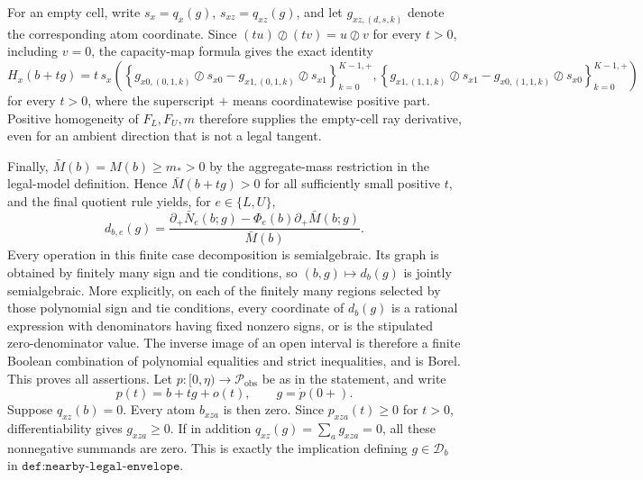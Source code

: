 For an empty cell, write \(s_x=q_x(g)\), \(s_{xz}=q_{xz}(g)\), and let \(g_{xz,(d,s,k)}\) denote the corresponding atom coordinate.  Since \((tu)\oslash(tv)=u\oslash v\) for every \(t>0\), including \(v=0\), the capacity-map formula gives the exact identity
\[
H_x(b+tg)=t\,s_x
\left(
\left\{g_{x0,(0,1,k)}\oslash s_{x0}-g_{x1,(0,1,k)}\oslash s_{x1}\right\}_{k=0}^{K-1,+},
\left\{g_{x1,(1,1,k)}\oslash s_{x1}-g_{x0,(1,1,k)}\oslash s_{x0}\right\}_{k=0}^{K-1,+}
\right)
\]
for every \(t>0\), where the superscript \(+\) means coordinatewise positive part.  Positive homogeneity of \(F_L,F_U,m\) therefore supplies the empty-cell ray derivative, even for an ambient direction that is not a legal tangent.

Finally, \(\bar M(b)=M(b)\ge m_*>0\) by the aggregate-mass restriction in the legal-model definition.  Hence \(\bar M(b+tg)>0\) for all sufficiently small positive \(t\), and the final quotient rule yields, for \(e\in\{L,U\}\),
\[
d_{b,e}(g)=
\frac{\partial_+\bar N_e(b;g)-\Phi_e(b)\partial_+\bar M(b;g)}{\bar M(b)}.
\]
Every operation in this finite case decomposition is semialgebraic.  Its graph is obtained by finitely many sign and tie conditions, so \((b,g)\mapsto d_b(g)\) is jointly semialgebraic.  More explicitly, on each of the finitely many regions selected by those polynomial sign and tie conditions, every coordinate of \(d_b(g)\) is a rational expression with denominators having fixed nonzero signs, or is the stipulated zero-denominator value.  The inverse image of an open interval is therefore a finite Boolean combination of polynomial equalities and strict inequalities, and is Borel.  This proves all assertions.
Let \(p:[0,\eta)\to\mathcal P_{\mathrm{obs}}\) be as in the statement, and write
\[
p(t)=b+t g+o(t),\qquad g=\dot p(0+).
\]
Suppose \(q_{xz}(b)=0\).  Every atom \(b_{xza}\) is then zero.  Since \(p_{xza}(t)\ge0\) for \(t>0\), differentiability gives \(g_{xza}\ge0\).  If in addition \(q_{xz}(g)=\sum_a g_{xza}=0\), all these nonnegative summands are zero.  This is exactly the implication defining \(g\in\mathcal D_b\) in \(\texttt{def:nearby-legal-envelope}\).

